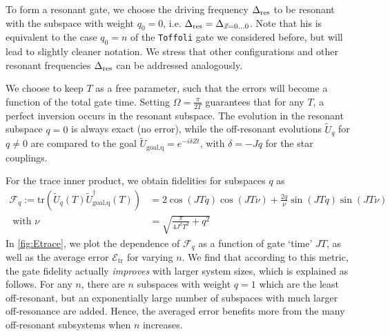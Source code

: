 To form a resonant gate, we choose the driving frequency $\Delta_{\text{res}}$ to be resonant with the subspace with weight $q_0 = 0$, i.e. $\Delta_{\text{res}} = \Delta_{\vec{x} = 0\ldots 0}$. Note that his is equivalent to the case $q_0=n$ of the \texttt{Toffoli} gate we considered before, but will lead to slightly cleaner notation. We stress that other configurations  and other resonant frequencies $\Delta_{\text{res}}$ can be addressed analogously. 

We choose to keep $T$ as a free parameter, such that the errors will become a function of the total gate time. Setting $\Omega = \frac{\pi}{2T}$ guarantees that for any $T$, a perfect inversion occurs in the resonant subspace. The evolution in the resonant subspace $q=0$ is always exact (no error), while the off-resonant evolutions $\tilde{U}_q$ for $q \neq 0$ are compared to the goal $\tilde{U}_\text{goal,q} = e^{-i \delta Z t}$, with $\delta = -Jq$ for the star couplings.
%


For the trace inner product, we obtain fidelities for subspaces $q$ as
\begin{align*}
\mathcal{F}_q := \text{tr} \left(  \tilde{U}_q(T) \tilde{U}^\dagger_\text{goal,q}(T) \right) &= 2 \cos( J T q ) \cos(J T \nu) +  \frac{2q}{\nu}  \sin( J T q) \sin( J T \nu ) \\
\text{ with } \nu &=  \sqrt{\frac{\pi}{4 J^2 T^2} + q^2} 
\end{align*}
In \cref{fig:Etrace}, we plot the dependence of $\mathcal{F}_q$ as a function of gate `time' $J T$, as well as the average error $\mathcal{E}_\text{tr}$ for varying $n$. We find that according to this metric, the gate fidelity actually \emph{improves} with larger system sizes, which is explained as follows. For any $n$, there are $n$ subspaces with weight $q=1$ which are the least off-resonant, but an exponentially large number of subspaces with much larger off-resonance are added. Hence, the averaged error benefits more from the many off-resonant subsystems when $n$ increases.

